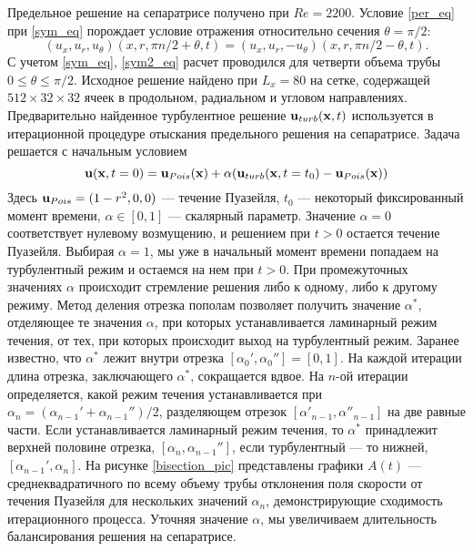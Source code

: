 Предельное решение на сепаратрисе получено при $Re=2200$. Условие \eqref{per_eq} при \eqref{sym_eq} порождает условие отражения относительно сечения $\theta = \pi/2$:
\begin{equation} \label{sym2_eq}
(u_x, u_r, u_\theta)(x, r, \pi n/2 + \theta, t) = (u_x, u_r, -u_\theta)(x, r, \pi n / 2 - \theta, t).
\end{equation}
С учетом \eqref{sym_eq}, \eqref{sym2_eq} расчет проводился для четверти объема трубы $0\leqslant\theta\leqslant\pi/2$. Исходное решение найдено при $L_x = 80$ на сетке, содержащей $512 \times 32 \times  32$ ячеек в продольном, радиальном и угловом направлениях. Предварительно найденное турбулентное решение $\mathbf{u}_{turb}(\mathbf{x},t)$ используется в итерационной процедуре отыскания предельного решения на сепаратрисе. Задача решается с начальным условием
\begin{equation} \label{edge_init_eq}
\mathbf{u}(\mathbf{x},t=0) = \mathbf{u}_{Pois}(\mathbf{x})+\alpha(\mathbf{u}_{turb}(\mathbf{x},t=t_0) - \mathbf{u}_{Pois}(\mathbf{x}))
\end{equation}
Здесь $\mathbf{u}_{Pois}=(1-r^2,0,0)$ --- течение Пуазейля, $t_0$ --- некоторый фиксированный момент времени, $\alpha \in [0,1]$ --- скалярный параметр. Значение $\alpha=0$ соответствует нулевому возмущению, и решением при $t>0$ остается течение Пуазейля. Выбирая $\alpha=1$, мы уже в начальный момент времени попадаем на турбулентный режим и остаемся на нем при $t>0$. При промежуточных значениях $\alpha$ происходит стремление решения либо к одному, либо к другому режиму. Метод деления отрезка пополам позволяет получить значение $\alpha^*$, отделяющее те значения $\alpha$, при которых устанавливается ламинарный режим течения, от тех, при которых происходит выход на турбулентный режим. Заранее известно, что $\alpha^*$ лежит внутри отрезка $[\alpha_0', \alpha_0''] = [0,1]$. На каждой итерации длина отрезка, заключающего $\alpha^*$, сокращается вдвое. На $n$-ой итерации определяется, какой режим течения устанавливается при $\alpha_{n} = (\alpha_{n-1}' + \alpha_{n-1}'') / 2$, разделяющем отрезок $[\alpha'_{n-1}, \alpha''_{n-1}]$ на две равные части. Если устанавливается ламинарный режим течения, то $\alpha^*$ принадлежит верхней половине отрезка, $[\alpha_{n}, \alpha_{n-1}'']$, если турбулентный --- то нижней, $[\alpha_{n-1}', \alpha_{n}]$. На рисунке \ref{bisection_pic} представлены графики $A(t)$ --- среднеквадратичного по всему объему трубы отклонения поля скорости от течения Пуазейля для нескольких значений $\alpha_n$, демонстрирующие сходимость итерационного процесса. Уточняя значение $\alpha$, мы увеличиваем длительность балансирования решения на сепаратрисе. 


